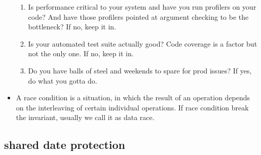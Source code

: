 \documentclass[a4paper,11pt,twoside]{book}
\begin{document}
\begin{itemize}
\begin{enumerate}
		\item Is performance critical to your system and have you run profilers on your code? And have those profilers pointed at argument checking to be the bottleneck? If no, keep it in.
		
		\item Is your automated test suite actually good? Code coverage is a factor but not the only one. If no, keep it in.
		\item Do you have balls of steel and weekends to spare for prod issues? If yes, do what you gotta do.
	\end{enumerate}
	
	\item A race condition is a situation, in which the result of an operation depends on the interleaving of certain individual operations. If race condition break the invariant, usually we call it as data race. 
\end{itemize}


\subsection{shared date protection}
\end{document}
